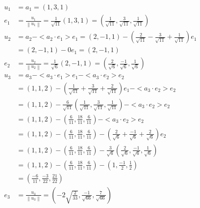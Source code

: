 \documentclass[11pt]{article}
\providecommand{\norm}[1]{\left\lVert #1 \right\rVert}
\begin{document}


\begin{align*}
    u_1 &= a_1 =  (1, 3, 1) \\
    e_1 &= \frac{u_1}{\norm{u_1}} = \frac{1}{\sqrt{11}}(1, 3, 1) = (\frac{1}{\sqrt{11}}, \frac{3}{\sqrt{11}}, \frac{1}{\sqrt{11}}) \\
    u_2 &= a_2 - <a_2 \cdot e_1> e_1 = (2, -1, 1) - (\frac{2}{\sqrt{11}} - \frac{3}{\sqrt{11}} + \frac{1}{\sqrt{11}}) e_1 \\&= (2, -1, 1) - 0 e_1 = (2, -1, 1) \\
    e_2 &= \frac{u_2}{\norm{u_2}} = \frac{1}{\sqrt{6}} (2, -1, 1)= (\frac{2}{\sqrt{6}}, \frac{-1}{\sqrt{6}}, \frac{1}{\sqrt{6}}) \\
    u_3 &= a_3 - <a_3 \cdot e_1> e_1 - <a_3 \cdot e_2> e_2 \\
    &= (1, 1, 2) - (\frac{1}{\sqrt{11}} + \frac{3}{\sqrt{11}} + \frac{2}{\sqrt{11}})e_1 -  <a_3 \cdot e_2> e_2 \\
    &= (1, 1, 2) - \frac{6}{\sqrt{11}}(\frac{1}{\sqrt{11}}, \frac{3}{\sqrt{11}}, \frac{1}{\sqrt{11}}) -  <a_3 \cdot e_2> e_2  \\
    &= (1, 1, 2) - (\frac{6}{11}, \frac{18}{11}, \frac{6}{11}) - <a_3 \cdot e_2> e_2  \\
    &= (1, 1, 2) - (\frac{6}{11}, \frac{18}{11}, \frac{6}{11}) - (\frac{2}{\sqrt{6}} + \frac{-1}{\sqrt{6}}+ \frac{2}{\sqrt{6}}) e_2 \\
    &= (1, 1, 2) - (\frac{6}{11}, \frac{18}{11}, \frac{6}{11}) -\frac{3}{\sqrt{6}}(\frac{2}{\sqrt{6}}, \frac{-1}{\sqrt{6}}, \frac{1}{\sqrt{6}}) \\
    &= (1, 1, 2) - (\frac{6}{11}, \frac{18}{11}, \frac{6}{11}) - (1, \frac{-1}{2}, \frac{1}{2})  \\
    &= (\frac{-6}{11}, \frac{-3}{22}, \frac{21}{22}) \\
    e_3 &= \frac{u_3}{\norm{u_3}} = (-2 \sqrt{\frac{2}{33}}, \frac{-1}{\sqrt{66}}, \frac{7}{\sqrt{66}})
\end{align*}
\end{document}
